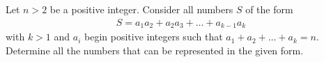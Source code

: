 Let $n>2$ be a positive integer. Consider all numbers $S$ of the form
\begin{align*} S= a_1 a_2 + a_2 a_3 + \ldots + a_{k-1} a_k \end{align*}with $k>1$ and $a_i$ begin positive integers such that $a_1+a_2+ \ldots + a_k=n$. Determine all the numbers that can be represented in the given form.